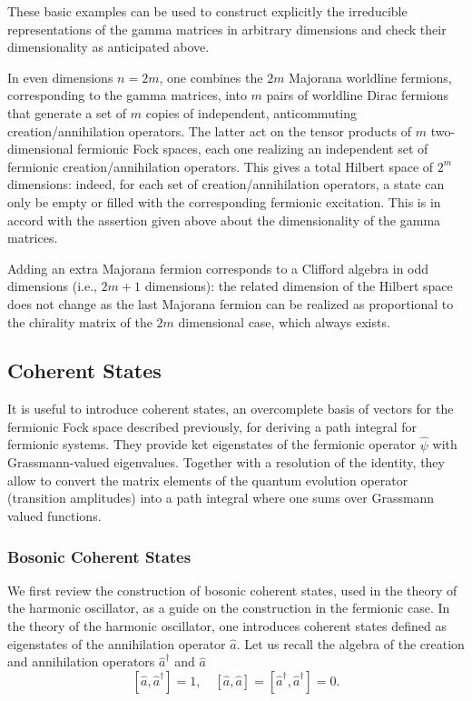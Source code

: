 These basic examples can be used to construct explicitly the irreducible representations of the gamma matrices in arbitrary dimensions and check their dimensionality as anticipated above.

In even dimensions \(n=2m\), one combines the \(2m\) Majorana worldline fermions, corresponding to the gamma matrices, into \(m\) pairs of worldline Dirac fermions that generate a set of \(m\) copies of independent, anticommuting creation/annihilation operators. The latter act on the tensor products of \(m\) two-dimensional fermionic Fock spaces, each one realizing an independent set of fermionic creation/annihilation operators. This gives a total Hilbert space of \(2^m\) dimensions: indeed, for each set of creation/annihilation operators, a state can only be empty or filled with the corresponding fermionic excitation. This is in accord with the assertion given above about the dimensionality of the gamma matrices.

Adding an extra Majorana fermion corresponds to a Clifford algebra in odd dimensions (i.e., \(2m+1\) dimensions): the related dimension of the Hilbert space does not change as the last Majorana fermion can be realized as proportional to the chirality matrix of the \(2m\) dimensional case, which always exists.

\subsection{Coherent States}\label{sec:coherent_states_fermions}

It is useful to introduce coherent states, an overcomplete basis of vectors for the fermionic Fock space described previously, for deriving a path integral for fermionic systems. They provide ket eigenstates of the fermionic operator \(\hat{\psi}\) with Grassmann-valued eigenvalues. Together with a resolution of the identity, they allow to convert the matrix elements of the quantum evolution operator (transition amplitudes) into a path integral where one sums over Grassmann valued functions.

\subsubsection{Bosonic Coherent States}

We first review the construction of bosonic coherent states, used in the theory of the harmonic oscillator, as a guide on the construction in the fermionic case. In the theory of the harmonic oscillator, one introduces coherent states defined as eigenstates of the annihilation operator \(\hat{a}\). Let us recall the algebra of the creation and annihilation operators \(\hat{a}^\dagger\) and \(\hat{a}\)
\[
    \left[\hat{a}, \hat{a}^\dagger \right] = 1, \quad \left[\hat{a}, \hat{a} \right] = \left[\hat{a}^\dagger, \hat{a}^\dagger \right] = 0.
\]

